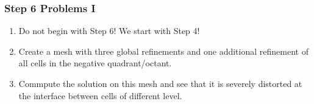 
\begin{frame}
  \frametitle{Step 6 Problems I}
  \begin{enumerate}
  \item Do not begin with Step 6! We start with Step 4!
  \item Create a mesh with three global refinements and one additional
    refinement of all cells in the negative quadrant/octant.
  \item Commpute the solution on this mesh and see that it is severely
    distorted at the interface between cells of different level.
  \end{enumerate}
\end{frame}

